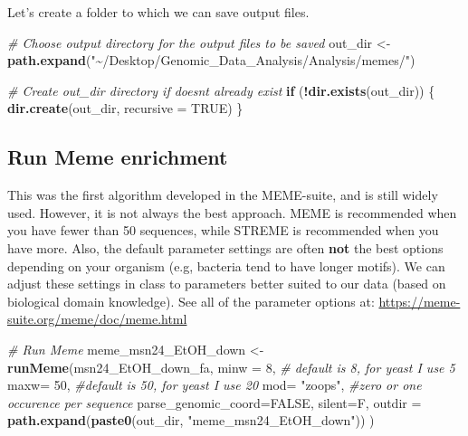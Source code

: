 \documentclass[
]{book}
\newenvironment{Shaded}{\begin{snugshade}}{\end{snugshade}}
\newcommand{\AttributeTok}[1]{\textcolor[rgb]{0.13,0.29,0.53}{#1}}
\newcommand{\CommentTok}[1]{\textcolor[rgb]{0.56,0.35,0.01}{\textit{#1}}}
\newcommand{\ConstantTok}[1]{\textcolor[rgb]{0.56,0.35,0.01}{#1}}
\newcommand{\ControlFlowTok}[1]{\textcolor[rgb]{0.13,0.29,0.53}{\textbf{#1}}}
\newcommand{\DecValTok}[1]{\textcolor[rgb]{0.00,0.00,0.81}{#1}}
\newcommand{\FunctionTok}[1]{\textcolor[rgb]{0.13,0.29,0.53}{\textbf{#1}}}
\newcommand{\NormalTok}[1]{#1}
\newcommand{\OtherTok}[1]{\textcolor[rgb]{0.56,0.35,0.01}{#1}}
\newcommand{\SpecialCharTok}[1]{\textcolor[rgb]{0.81,0.36,0.00}{\textbf{#1}}}
\newcommand{\StringTok}[1]{\textcolor[rgb]{0.31,0.60,0.02}{#1}}
\begin{document}
Let's create a folder to which we can save output files.

\begin{Shaded}
\begin{Highlighting}[]
\CommentTok{\# Choose output directory for the output files to be saved}
\NormalTok{out\_dir }\OtherTok{\textless{}{-}} \FunctionTok{path.expand}\NormalTok{(}\StringTok{"\textasciitilde{}/Desktop/Genomic\_Data\_Analysis/Analysis/memes/"}\NormalTok{)}

\CommentTok{\# Create out\_dir directory if doesn\textquotesingle{}t already exist}
\ControlFlowTok{if}\NormalTok{ (}\SpecialCharTok{!}\FunctionTok{dir.exists}\NormalTok{(out\_dir)) \{}
  \FunctionTok{dir.create}\NormalTok{(out\_dir, }\AttributeTok{recursive =} \ConstantTok{TRUE}\NormalTok{)}
\NormalTok{\}}
\end{Highlighting}
\end{Shaded}

\hypertarget{run-meme-enrichment}{%
\subsection{Run Meme enrichment}\label{run-meme-enrichment}}

This was the first algorithm developed in the MEME-suite, and is still
widely used. However, it is not always the best approach. MEME is
recommended when you have fewer than 50 sequences, while STREME is
recommended when you have more. Also, the default parameter settings are
often \textbf{not} the best options depending on your organism (e.g, bacteria
tend to have longer motifs). We can adjust these settings in class to
parameters better suited to our data (based on biological domain
knowledge). See all of the parameter options at:
\url{https://meme-suite.org/meme/doc/meme.html}

\begin{Shaded}
\begin{Highlighting}[]
\CommentTok{\# Run Meme}
\NormalTok{meme\_msn24\_EtOH\_down }\OtherTok{\textless{}{-}} \FunctionTok{runMeme}\NormalTok{(msn24\_EtOH\_down\_fa, }
        \AttributeTok{minw =} \DecValTok{8}\NormalTok{, }\CommentTok{\# default is 8, for yeast I use 5}
        \AttributeTok{maxw=} \DecValTok{50}\NormalTok{, }\CommentTok{\#default is 50, for yeast I use 20}
        \AttributeTok{mod=} \StringTok{"zoops"}\NormalTok{, }\CommentTok{\#zero or one occurence per sequence}
        \AttributeTok{parse\_genomic\_coord=}\ConstantTok{FALSE}\NormalTok{,}
        \AttributeTok{silent=}\NormalTok{F,}
        \AttributeTok{outdir =} \FunctionTok{path.expand}\NormalTok{(}\FunctionTok{paste0}\NormalTok{(out\_dir, }\StringTok{"meme\_msn24\_EtOH\_down"}\NormalTok{))}
\NormalTok{        )}
\end{Highlighting}
\end{Shaded}
\end{document}
